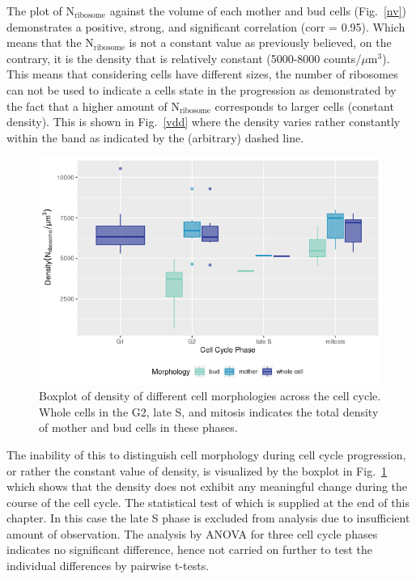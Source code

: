 The plot of N$_{\text{ribosome}}$ against the volume of each mother and bud cells (Fig.~\ref{nv}) demonstrates a positive, strong, and significant correlation (corr = 0.95). 
Which means that the N$_{\text{ribosome}}$ is not a constant value as previously believed, on the contrary, it is the density that is relatively constant (5000-8000 counts/$\mu$m$^3$).
This means that considering cells have different sizes, the number of ribosomes can not be used to indicate a cells state in the progression as demonstrated by the fact that a higher amount of N$_{\text{ribosome}}$ corresponds to larger cells (constant density). 
This is shown in Fig.~\ref{vdd} where the density varies rather constantly within the band as indicated by the (arbitrary) dashed line.

\begin{figure}[h!]
\centering
\includegraphics[width=0.9\columnwidth]{Exp_9_FCS/Figures/box_d_all}
\caption{Boxplot of density of different cell morphologies across the cell cycle. Whole cells in the G2, late S, and mitosis indicates the total density of mother and bud cells in these phases.}
\label{fig:bplot}
\end{figure}

The inability of this to distinguish cell morphology during cell cycle progression, or rather the constant value of density, is visualized by the boxplot in Fig.~\ref{fig:bplot} which shows that the density does not exhibit any meaningful change during the course of the cell cycle. 
The statistical test of which is supplied at the end of this chapter. In this case the late S phase is excluded from analysis due to insufficient amount of observation. 
The analysis by ANOVA for three cell cycle phases indicates no significant difference, hence not carried on further to test the individual differences by pairwise t-tests.

